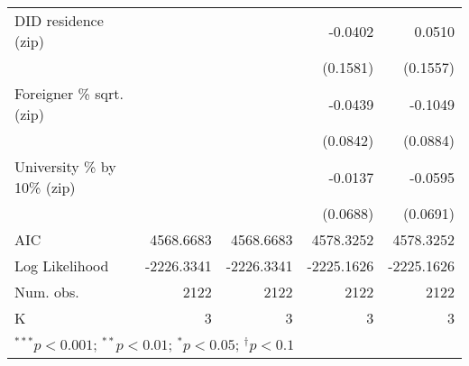 \begin{tabular}{l D{.}{.}{5.7} D{.}{.}{5.11} D{.}{.}{5.11} D{.}{.}{5.11}}
DID residence (zip)               &               &                  & -0.0402           & 0.0510           \\
                                  &               &                  & (0.1581)          & (0.1557)         \\
Foreigner \% sqrt. (zip)          &               &                  & -0.0439           & -0.1049          \\
                                  &               &                  & (0.0842)          & (0.0884)         \\
University \% by 10\% (zip)       &               &                  & -0.0137           & -0.0595          \\
                                  &               &                  & (0.0688)          & (0.0691)         \\
\midrule
AIC                               & 4568.6683     & 4568.6683        & 4578.3252         & 4578.3252        \\
Log Likelihood                    & -2226.3341    & -2226.3341       & -2225.1626        & -2225.1626       \\
Num. obs.                         & 2122          & 2122             & 2122              & 2122             \\
K                                 & 3             & 3                & 3                 & 3                \\
\bottomrule
{}
\end{tabular}
